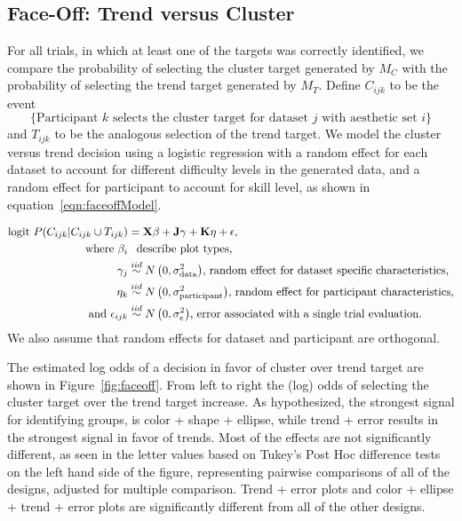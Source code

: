 \documentclass[12pt]{article}\usepackage[]{graphicx}\usepackage[]{color}
\begin{document}
\subsection{Face-Off: Trend versus Cluster}\label{sec:faceoff}

 For all trials, in which at least one of the targets was correctly identified, we compare the probability of selecting the cluster target generated by $M_C$  with the probability of selecting the trend target generated by $M_T$. 
Define $C_{ijk}$ to be the event $$\{\text{Participant }k\text{ selects the cluster target for dataset }j\text{ with aesthetic set }i\}$$
and $T_{ijk}$ to be the analogous selection of the trend target.
We model the cluster versus trend decision using a logistic regression with a random effect for each dataset to account for different difficulty levels in the generated data, and a random effect for participant to account for skill level, as shown in equation~\ref{eqn:faceoffModel}. 


\begin{align}
\text{logit }P(C_{ijk} | C_{ijk}\cup T_{ijk}) & =  \textbf{X}\beta + \textbf{J}\gamma + \textbf{K}\eta + \epsilon, \label{eqn:faceoffModel}\\
\text{where } \beta_i & \hphantom{\sim} \text{describe plot types,}\nonumber\\
\hphantom{where } \gamma_j & \overset{iid}{\sim} N\left(0, \sigma^2_{\text{data}}\right)\!\text{,  random effect for dataset specific characteristics,}\nonumber\\
\hphantom{where } \eta_k & \overset{iid}{\sim} N\left(0, \sigma^2_{\text{participant}}\right)\!\text{, random effect for participant characteristics,}\nonumber\\
\text{and } \epsilon_{ijk} & \overset{iid}{\sim}  N\left(0, \sigma^2_e\right)\!\text{, error associated with a single trial evaluation.} \nonumber\end{align}
We also assume that random effects for dataset and participant are orthogonal. 

The estimated log odds of a decision in favor of cluster over trend target are shown in Figure~\ref{fig:faceoff}. From left to right the (log) odds of selecting the cluster target over the trend target increase. As hypothesized, the strongest signal for identifying groups, is color + shape + ellipse, while trend + error results in the strongest signal in favor of trends. Most of the effects are not significantly different, as seen in the letter values \citep{piepho:04} based on Tukey's Post Hoc difference tests on the left hand side of the figure, representing pairwise comparisons of all of the designs, adjusted for multiple comparison. Trend + error plots and color + ellipse + trend + error plots are significantly different from all of the other designs. 
\end{document}
